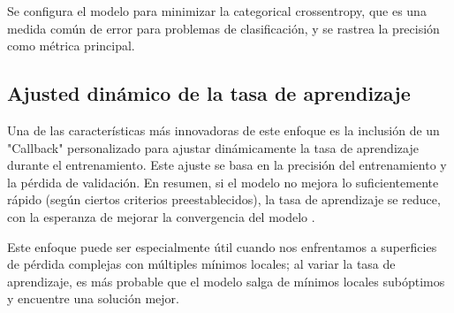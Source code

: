 Se configura el modelo para minimizar la categorical crossentropy, que es una medida común de error para problemas de clasificación, y se rastrea la precisión como métrica principal.

\subsection{Ajusted dinámico de la tasa de aprendizaje}

Una de las características más innovadoras de este enfoque es la inclusión de un "Callback" personalizado para ajustar dinámicamente la tasa de aprendizaje durante el entrenamiento. Este ajuste se basa en la precisión del entrenamiento y la pérdida de validación. En resumen, si el modelo no mejora lo suficientemente rápido (según ciertos criterios preestablecidos), la tasa de aprendizaje se reduce, con la esperanza de mejorar la convergencia del modelo .

Este enfoque puede ser especialmente útil cuando nos enfrentamos a superficies de pérdida complejas con múltiples mínimos locales; al variar la tasa de aprendizaje, es más probable que el modelo salga de mínimos locales subóptimos y encuentre una solución mejor.
